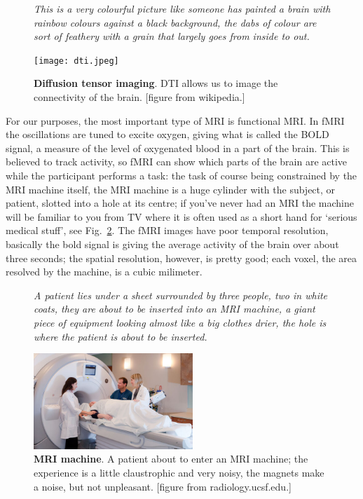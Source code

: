 \documentclass[12pt]{article}
\begin{document}
\begin{figure}
{\textsl{This is a very colourful picture like someone has painted a brain with rainbow colours against a black background, the dabs of colour are sort of feathery with a grain that largely goes from inside to out.}}
{
  \begin{center}
  \texttt{[image: dti.jpeg]}
  \end{center}
  }
  \caption{\textbf{Diffusion tensor imaging}. DTI allows us to image the connectivity of the brain. [figure from wikipedia.]\label{fig:dti}}
\end{figure}

For our purposes, the most important type of MRI is functional MRI. In
fMRI the oscillations are tuned to excite oxygen, giving what is
called the BOLD signal, a measure of the level of oxygenated blood in
a part of the brain. This is believed to track activity, so fMRI can
show which parts of the brain are active while the participant
performs a task: the task of course being constrained by the MRI
machine itself, the MRI machine is a huge cylinder with the subject,
or patient, slotted into a hole at its centre; if you've never had an
MRI the machine will be familiar to you from TV where it is often used
as a short hand for `serious medical stuff', see
Fig.~\ref{fig:mri}. The fMRI images have poor temporal resolution,
basically the bold signal is giving the average activity of the brain
over about three seconds; the spatial resolution, however, is pretty
good; each voxel, the area resolved by the machine, is a cubic
milimeter.


\begin{figure}
{\textsl{A patient lies under a sheet surrounded by three people, two in white coats, they are about to be inserted into an MRI machine, a giant piece of equipment looking almost like a big clothes drier, the hole is where the patient is about to be inserted.}}
{
  \begin{center}
  \includegraphics[width=6cm]{mri.jpg}
  \end{center}
  }
  \caption{\textbf{MRI machine}. A patient about to enter an MRI
    machine; the experience is a little claustrophic and very noisy,
    the magnets make a noise, but not unpleasant. [figure from
      radiology.ucsf.edu.]\label{fig:mri}}
\end{figure}
\end{document}
